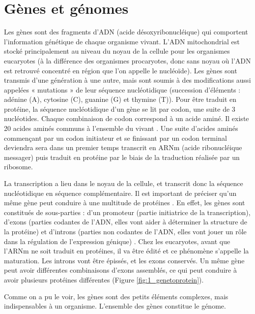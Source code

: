 \section{Gènes et génomes}\label{genes}
\par Les gènes sont des fragments d’ADN (acide désoxyribonucléique) qui comportent l’information génétique de chaque organisme vivant. L’ADN mitochondrial est stocké principalement au niveau du noyau de la cellule pour les organismes eucaryotes (à la différence des organismes procaryotes, donc sans noyau où l’ADN est retrouvé concentré en région que l’on appelle le nucléoïde). Les gènes sont transmis d’une génération à une autre, mais sont soumis à des modifications aussi appelées « mutations » de leur séquence nucléotidique (succession d’éléments : adénine (A), cytosine (C), guanine (G) et thymine (T)). Pour être traduit en protéine, la séquence nucléotidique d’un gène se lit par codon, une suite de 3 nucléotides. Chaque combinaison de codon correspond à un acide aminé. Il existe 20 acides aminés communs à l’ensemble du vivant \parencite{ambrogelly_natural_2007}. Une suite d’acides aminés commençant par un codon initiateur et se finissant par un codon terminal deviendra sera dans un premier temps transcrit en ARNm (acide ribonucléique messager) puis traduit en protéine par le biais de la traduction réalisée par un ribosome.
\par La transcription a lieu dans le noyau de la cellule, et transcrit donc la séquence nucléotidique en séquence complémentaire. Il est important de préciser qu’un même gène peut conduire à une multitude de protéines \parencite{breathnach_organization_1981}. En effet, les gènes sont constitués de sous-parties : d’un promoteur (partie initiatrice de la transcription), d’exons (parties codantes de l’ADN, elles vont aider à déterminer la structure de la protéine) et d’introns (parties non codantes de l’ADN, elles vont jouer un rôle dans la régulation de l’expression génique) \parencite{scherrer_pre-messenger_1979, keren_alternative_2010, shaul_how_2017}. Chez les eucaryotes, avant que l’ARNm ne soit traduit en protéines, il va être édité et ce phénomène s’appelle la maturation. Les introns vont être épissés, et les exons conservés. Un même gène peut avoir différentes combinaisons d’exons assemblés, ce qui peut conduire à avoir plusieurs protéines différentes (Figure \ref{fig:1_genetoprotein}).
\par Comme on a pu le voir, les gènes sont des petits éléments complexes, mais indispensables à un organisme. L’ensemble des gènes constitue le génome. 

